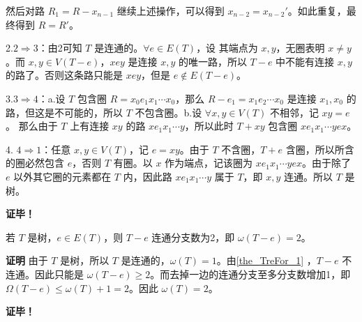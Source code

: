 然后对路 $R_1=R-x_{n-1}$ 继续上述操作，可以得到 $x_{n-2}=x_{n-2}'$。如此重复，最终得到 $R=R'$。

2.$2\Rightarrow 3$：由2可知 $T$ 是连通的。$\forall e\in E(T)$，设 其端点为 $x,y$，无圈表明 $x\neq y$。而 $x,y\in V(T-e)$，$xey$ 是连接 $x,y$ 的唯一路，所以 $T-e$ 中不能有连接 $x,y$ 的路了。否则这条路只能是 $xey$，但是 $e\not\in E(T-e)$。

3.$3\Rightarrow 4$：a.设 $T$ 包含圈 $R=x_0e_1x_1\cdots x_0$，那么 $R-e_1=x_1e_2\cdots x_0$ 是连接 $x_1,x_0$ 的路，但这是不可能的，所以 $T$ 不包含圈。b.设 $\forall x,y\in V(T)$ 不相邻，记 $xy=e$。 那么由于 $T$ 上有连接 $xy$ 的路 $xe_1x_1\cdots y$，所以此时 $T+xy$ 包含圈 $xe_1x_1\cdots yex$。 

4. $4\Rightarrow 1$：任意 $x,y\in V(T)$，记 $e=xy$。由于 $T$ 不含圈，$T+e$ 含圈，所以所含的圈必然包含 $e$，否则 $T$ 有圈。以 $x$ 作为端点，记该圈为 $xe_1x_1\cdots yex$。由于除了 $e$ 以外其它圈的元素都在 $T$ 内，因此路 $x e_1x_1\cdots y$ 属于 $T$，即 $x,y$ 连通。所以 $T$ 是树。 

\textbf{证毕！}


\begin{corollary}{}
若 $T$ 是树，$e\in E(T)$，则 $T-e$ 连通分支数为2，即 $\omega(T-e)=2$。
\end{corollary}
\textbf{证明}
由于 $T$ 是树，所以 $T$ 是连通的，$\omega(T)=1$。由\autoref{the_TreFor_1} ，$T-e$ 不连通。因此只能是 $\omega(T-e)\geq 2$。而去掉一边的连通分支至多分支数增加1，即 $\Omega(T-e)\leq \omega(T)+1=2$。因此 $\omega(T)=2$。

\textbf{证毕！}





















